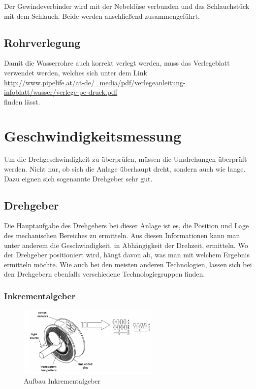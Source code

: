Der Gewindeverbinder wird mit der Nebeldüse verbunden und das Schlauchstück mit dem Schlauch. Beide werden anschließend zusammengeführt.

\subsection{Rohrverlegung}
\label{sec:rohrverlegung}

Damit die Wasserrohre auch korrekt verlegt werden, muss das Verlegeblatt verwendet werden, welches sich unter dem Link \\ \url{http://www.pipelife.at/at-de/_media/pdf/verlegeanleitung-infoblatt/wasser/verlege-pe-druck.pdf} \\finden lässt.

\newpage
\section{Geschwindigkeitsmessung}
\label{sec:geschwindigkeitsmessung}

Um die Drehgeschwindigkeit zu überprüfen, müssen die Umdrehungen überprüft werden. Nicht nur, ob sich die Anlage überhaupt dreht, sondern auch wie lange. Dazu eignen sich sogenannte Drehgeber sehr gut.

\subsection{Drehgeber}
\label{sec:drehgeber}

Die Hauptaufgabe des Drehgebers bei dieser Anlage ist es, die Position und Lage des mechanischen Bereiches zu ermitteln. Aus diesen Informationen kann man unter anderem die Geschwindigkeit, in Abhängigkeit der Drehzeit, ermitteln. Wo der Drehgeber positioniert wird, hängt davon ab, was man mit welchem Ergebnis ermitteln möchte. Wie auch bei den meisten anderen Technologien, lassen sich bei den Drehgebern ebenfalls verschiedene Technologiegruppen finden.

\subsubsection{Inkrementalgeber}
\label{sec:inkrementalgeber}

\begin{figure}[H]
\begin{center}
	\includegraphics[width=0.61\textwidth]{fig/Inkrementalgeber}
	\caption{Aufbau Inkrementalgeber \label{fig:inkrementalgeber} \cite{aufbauInkrementalgeber}}
\end{center}
\end{figure}

